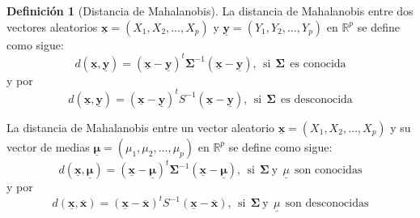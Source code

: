 \documentclass[
]{book}
\theoremstyle{definition}
\newtheorem{definition}{Definición}[chapter]
\theoremstyle{definition}
\theoremstyle{definition}
\theoremstyle{definition}
\theoremstyle{remark}
\begin{document}
\begin{definition}[Distancia de Mahalanobis]
\protect\hypertarget{def:dist-mahalanobis}{}\label{def:dist-mahalanobis}La distancia de Mahalanobis entre dos vectores aleatorios
\(\underline{\mathbf{x}}=(X_1,X_2,\ldots,X_p)\) y \(\underline{\mathbf{y}}=(Y_1,Y_2,\ldots,Y_p)\) en \(\mathbb{R}^p\) se define como sigue:
\[
d(\underline{\mathbf{x}},\underline{\mathbf{y}})=
(\underline{\mathbf{x}}-\underline{\mathbf{y}})^t\mathbf{\Sigma}^{-1}(\underline{\mathbf{x}}-\underline{\mathbf{y}}), \ \ \text{si} \ \ \mathbf{\Sigma} \ \ \text{es conocida}
\]
y por
\[
d(\underline{\mathbf{x}},\underline{\mathbf{y}})=
(\underline{\mathbf{x}}-\underline{\mathbf{y}})^tS^{-1}(\underline{\mathbf{x}}-\underline{\mathbf{y}}), \ \ \text{si} \ \ \mathbf{\Sigma} \ \ \text{es desconocida}
\]

La distancia de Mahalanobis entre un vector aleatorio
\(\underline{\mathbf{x}}=(X_1,X_2,\ldots,X_p)\) y su vector de medias \(\underline{\mathbf{\mu}}=(\mu_1,\mu_2,\ldots,\mu_p)\) en \(\mathbb{R}^p\) se define como sigue:
\[
d(\underline{\mathbf{x}},\underline{\mathbf{\mu}})=
(\underline{\mathbf{x}}-\underline{\mathbf{\mu}})^t\mathbf{\Sigma}^{-1}(\underline{\mathbf{x}}-\underline{\mathbf{\mu}}), \ \ \text{si} \ \ \mathbf{\Sigma} \ \text{y} \ \ \underline{\mu} \ \ \text{son conocidas}
\]
y por
\[
d(\underline{\mathbf{x}},\overline{\mathbf{x}})=
(\underline{\mathbf{x}}-\overline{\mathbf{x}})^t S^{-1}(\underline{\mathbf{x}}-\overline{\mathbf{x}}), \ \ \text{si} \ \ \mathbf{\Sigma} \ \text{y} \ \ \underline{\mu} \ \ \text{son desconocidas}
\]
\end{definition}
\end{document}
